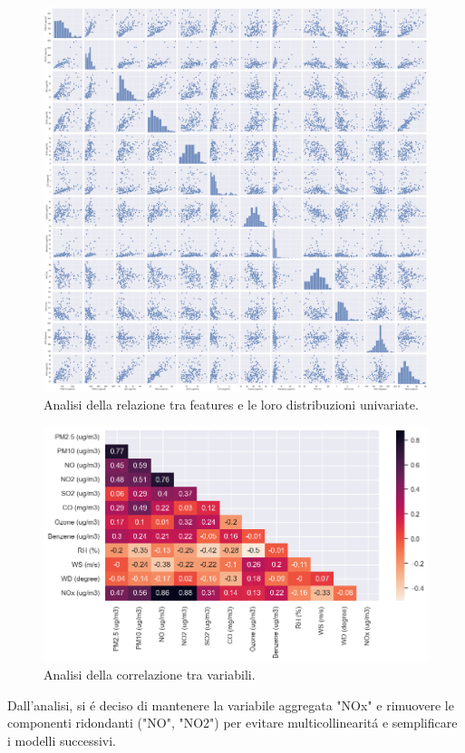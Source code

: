 \documentclass[a4paper,12pt]{report}
\begin{document}
	\begin{figure}[H]
		\centering
		\includegraphics[width=1.0\textwidth]{img/corr_pairplot_pm.png}
		\caption{Analisi della relazione tra features e le loro distribuzioni univariate.}
	\end{figure}
	\begin{figure}[H]
		\centering
		\includegraphics[width=1.0\textwidth]{img/corr_pm.png}
		\caption{Analisi della correlazione tra variabili.}
	\end{figure}
	
	Dall'analisi, si é deciso di mantenere la variabile aggregata "NOx" e rimuovere le componenti ridondanti ("NO", "NO2") per evitare multicollinearitá e semplificare i modelli successivi.
	
\end{document}
